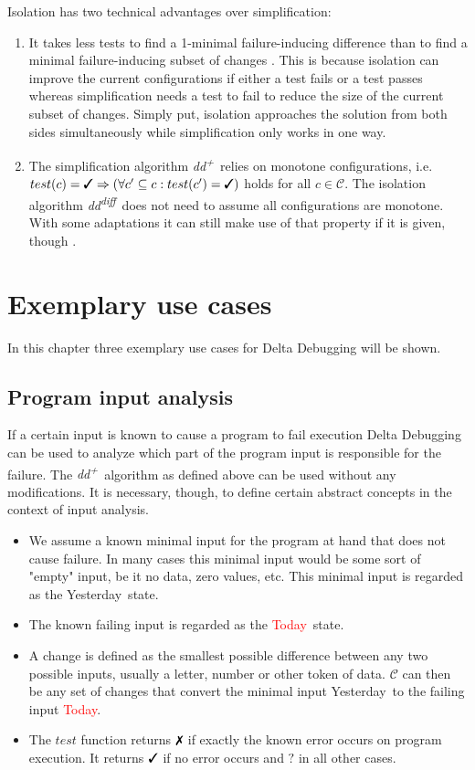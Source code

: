 \documentclass[a4paper,UKenglish]{lipics-v2018}
\newcommand{\ddp}{\textit{dd\textsuperscript{+}}}
\newcommand{\dddiff}{\textit{dd\textsuperscript{diff}}}
\newcommand{\green}[1]{\textcolor{td-green}{#1}}
\newcommand{\red}[1]{\textcolor{red}{#1}}
\newcommand{\yd}[0]{\green{Yesterday}}
\newcommand{\td}[0]{\red{Today}}
\newcommand{\C}[0]{\ensuremath{\mathcal{C}}}
\newcommand{\cmark}{\text{\ding{51}}}
\newcommand{\xmark}{\text{\ding{55}}}
\newcommand{\qmark}{\textbf{?}}
\begin{document}
Isolation has two technical advantages over simplification:
\begin{enumerate}
	\item It takes less tests to find a 1-minimal failure-inducing difference than to find a minimal failure-inducing subset of changes \cite{Zeller:2002:SIF:506201.506206}.
	This is because isolation can improve the current configurations if either a test fails or a test passes whereas simplification needs a test to fail to reduce the size of the current subset of changes. Simply put, isolation approaches the solution from both sides simultaneously while simplification only works in one way.
	\item The simplification algorithm \ddp\ relies on monotone configurations, i.e. $test(c)=\cmark \Rightarrow (\forall c' \subseteq c : test(c') = \cmark)$ holds for all $c \in \C$. The isolation algorithm \dddiff\ does not need to assume all configurations are monotone. With some adaptations it can still make use of that property if it is given, though \cite{Zeller:2002:SIF:506201.506206}.
\end{enumerate}

\section{Exemplary use cases}

In this chapter three exemplary use cases for Delta Debugging will be shown.

\subsection{Program input analysis}

If a certain input is known to cause a program to fail execution Delta Debugging can be used to analyze which part of the program input is responsible for the failure. The \ddp\ algorithm as defined above can be used without any modifications. It is necessary, though, to define certain abstract concepts in the context of input analysis.\\
\begin{itemize}
  	\item We assume a known minimal input for the program at hand that does not cause failure. In many cases this minimal input would be some sort of "empty" input, be it no data, zero values, etc. This minimal input is regarded as the \yd\ state.
  	\item The known failing input is regarded as the \td\ state.
  	\item A change is defined as the smallest possible difference between any two possible inputs, usually a letter, number or other token of data. $\C$ can then be any set of changes that convert the minimal input \yd\ to the failing input \td.
  	\item The $test$ function returns $\xmark$ if exactly the known error occurs on program execution. It returns $\cmark$ if no error occurs and $\qmark$ in all other cases. 
\end{itemize}
\end{document}

